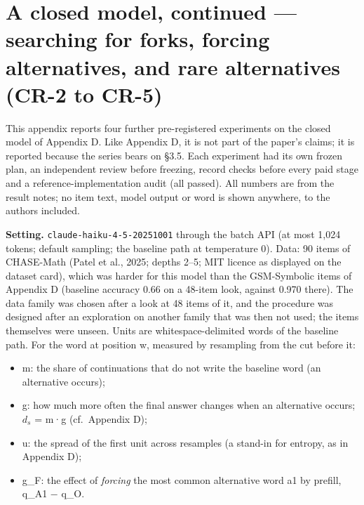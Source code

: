 \documentclass[
  10pt,
  a4paper,
]{article}
\providecommand{\tightlist}{%
  \setlength{\itemsep}{0pt}\setlength{\parskip}{0pt}}
\begin{document}
\hypertarget{a-closed-model-continued-searching-for-forks-forcing-alternatives-and-rare-alternatives-cr-2-to-cr-5}{%
\section{A closed model, continued --- searching for forks, forcing alternatives, and rare alternatives (CR-2 to
CR-5)}\label{a-closed-model-continued-searching-for-forks-forcing-alternatives-and-rare-alternatives-cr-2-to-cr-5}}

This appendix reports four further pre-registered experiments on the closed model of Appendix D. Like Appendix D, it is not part of the paper's claims; it is reported because the series bears on §3.5.
Each experiment had its own frozen plan, an independent review before freezing, record checks before every paid stage and a reference-implementation audit (all passed). All numbers are from the result
notes; no item text, model output or word is shown anywhere, to the authors included.

\textbf{Setting.} \texttt{claude-haiku-4-5-20251001} through the batch API (at most 1,024 tokens; default sampling; the baseline path at temperature 0). Data: 90 items of CHASE-Math (Patel et al.,
2025; depths 2--5; MIT licence as displayed on the dataset card), which was harder for this model than the GSM-Symbolic items of Appendix D (baseline accuracy 0.66 on a 48-item look, against 0.970
there). The data family was chosen after a look at 48 items of it, and the procedure was designed after an exploration on another family that was then not used; the items themselves were unseen. Units
are whitespace-delimited words of the baseline path. For the word at position w, measured by resampling from the cut before it:

\begin{itemize}
\tightlist
\item
  m: the share of continuations that do not write the baseline word (an alternative occurs);
\item
  g: how much more often the final answer changes when an alternative occurs; \(d_{s}\) = m·g (cf.~Appendix D);
\item
  u: the spread of the first unit across resamples (a stand-in for entropy, as in Appendix D);
\item
  g\_F: the effect of \emph{forcing} the most common alternative word a1 by prefill, q\_A1 − q\_O.
\end{itemize}
\end{document}

